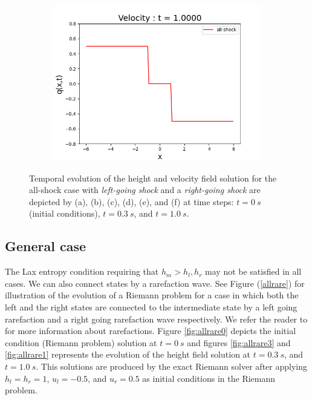 \documentclass[10pt,a4paper]{article}
\begin{document}
\begin{figure}[H]
\begin{subfigure}{0.33\textwidth}
			\includegraphics[width=\linewidth]{images/allshockv1}
			\caption{}
			\label{fig:allshockv1}
		\end{subfigure}
		\caption{Temporal evolution of the height and velocity field solution for the all-shock case with {\em left-going shock} and a {\em right-going shock}  are depicted by (a), (b), (c), (d), (e), and (f) at time steps: $t=0~s$ (initial conditions), $t = 0.3~s$, and $t = 1.0~s$. }
		\label{fig:allshock}
	\end{figure}
	
	\subsection{General case}
	The Lax entropy condition requiring that $h_m > h_l, h_r$ may not be satisfied in all cases.  We can also connect states by a rarefaction wave. See Figure (\ref{allrare})  for illustration of the evolution of a Riemann problem  for a case in which both the left and  the right states are connected to the intermediate state by a left going rarefaction and a right going rarefaction wave  respectively.   We refer the reader to   \citet{leveque2002finite} for more information about rarefactions.  Figure \ref{fig:allrare0} depicts the initial condition (Riemann problem) solution at  $t=0~s$  and figures \ref{fig:allrare3} and \ref{fig:allrare1} represents the evolution of the height field solution at $t = 0.3~s$, and $t = 1.0~s$.  This solutions are produced by the exact Riemann solver after applying $h_l = h_r = 1$, $u_l  =  -0.5$, and $u_r = 0.5$ as initial conditions in  the Riemann problem.
	
\end{document}
